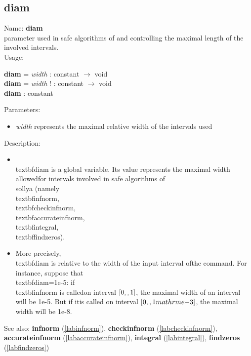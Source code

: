 \subsection{diam}
\label{labdiam}
\noindent Name: \textbf{diam}\\
parameter used in safe algorithms of \sollya and controlling the maximal length of the involved intervals.\\
\noindent Usage: 
\begin{center}
\textbf{diam} = \emph{width} : \textsf{constant} $\rightarrow$ \textsf{void}\\
\textbf{diam} = \emph{width} ! : \textsf{constant} $\rightarrow$ \textsf{void}\\
\textbf{diam} : \textsf{constant}\\
\end{center}
Parameters: 
\begin{itemize}
\item \emph{width} represents the maximal relative width of the intervals used
\end{itemize}
\noindent Description: \begin{itemize}

\item \\textbf{diam} is a global variable. Its value represents the maximal width allowed\n   for intervals involved in safe algorithms of \\sollya (namely \\textbf{infnorm},\n   \\textbf{checkinfnorm}, \\textbf{accurateinfnorm}, \\textbf{integral}, \\textbf{findzeros}).\n
\item More precisely, \\textbf{diam} is relative to the width of the input interval of\n   the command. For instance, suppose that \\textbf{diam}=1e-5: if \\textbf{infnorm} is called\n   on interval $[0,\\,1]$, the maximal width of an interval will be 1e-5. But if it\n   is called on interval $[0,\\,1\\mathrm{e}{-3}]$, the maximal width will be 1e-8.\n\end{itemize}
See also: \textbf{infnorm} (\ref{labinfnorm}), \textbf{checkinfnorm} (\ref{labcheckinfnorm}), \textbf{accurateinfnorm} (\ref{labaccurateinfnorm}), \textbf{integral} (\ref{labintegral}), \textbf{findzeros} (\ref{labfindzeros})
